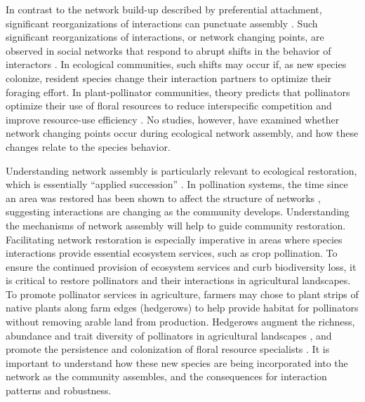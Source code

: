 \documentclass[12pt]{article}
\begin{document}
In contrast to the network build-up described by preferential
attachment, significant reorganizations of interactions can punctuate
assembly \citep{peel2014detecting}. Such significant reorganizations
of interactions, or network changing points, are observed in social
networks that respond to abrupt shifts in the behavior of interactors
\citep{peel2014detecting}. In ecological communities, such shifts may
occur if, as new species colonize, resident species change their
interaction partners to optimize their foraging effort. In
plant-pollinator communities, theory predicts that pollinators
optimize their use of floral resources to reduce interspecific
competition and improve resource-use efficiency
\citep{pyke1984optimal, valdovinos2010consequences,
  valdovinos2013adaptive, albrecht2010plant, Bluthgen2007}. No
studies, however, have examined whether network changing points occur
during ecological network assembly, and how these changes relate to
the species behavior.

Understanding network assembly is particularly relevant to ecological
restoration, which is essentially ``applied succession''
\citep[e.g.,][]{parker1997scale}. In pollination systems, the time
since an area was restored has been shown to affect the structure of
networks \citep{forup-2008-742, devoto2012understanding}, suggesting
interactions are changing as the community develops. Understanding the
mechanisms of network assembly will help to guide community
restoration. Facilitating network restoration is especially imperative
in areas where species interactions provide essential ecosystem
services, such as crop pollination. To ensure the continued provision
of ecosystem services and curb biodiversity loss, it is critical to
restore pollinators and their interactions in agricultural
landscapes. To promote pollinator services in agriculture, farmers may
chose to plant strips of native plants along farm edges (hedgerows) to
help provide habitat for pollinators without removing arable land from
production. Hedgerows augment the richness, abundance and trait
diversity of pollinators in agricultural landscapes
\citep{morandin-2013-829, kremen-2015-602, ponisio2015farm}, and
promote the persistence and colonization of floral resource
specialists \citep{mgonigle-2015-x}. It is important to understand how
these new species are being incorporated into the network as the
community assembles, and the consequences for interaction patterns and
robustness.
\end{document}
